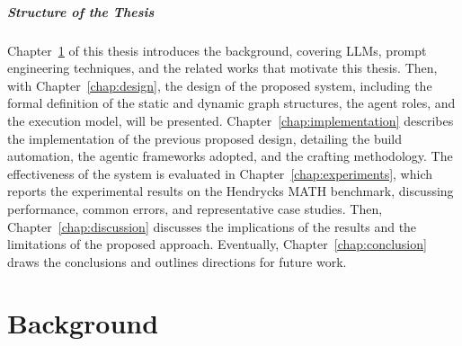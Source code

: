 \documentclass[12pt,a4paper,openright,twoside]{book}
\begin{document}
\paragraph{Structure of the Thesis}
Chapter~\ref{chap:background} of this thesis 
introduces the background, covering \acp{LLM}, prompt engineering
techniques, and the related works that motivate this thesis.
%
Then, with Chapter~\ref{chap:design}, the design of the proposed system,
including the formal definition of the static and dynamic graph structures,
the agent roles, and the execution model, will be presented.
%
Chapter~\ref{chap:implementation} describes the implementation of the previous proposed design, detailing the build automation,
the agentic frameworks adopted, and the crafting methodology.
%
The effectiveness of the system is evaluated in Chapter~\ref{chap:experiments}, which reports the experimental
results on the Hendrycks MATH benchmark, discussing performance, common errors, and representative case studies.
%
Then, Chapter~\ref{chap:discussion} discusses the implications of the results and the limitations
of the proposed approach.
%
Eventually, Chapter~\ref{chap:conclusion} draws the conclusions and outlines directions for
future work.

\chapter{Background} 
\label{chap:background}
\end{document}
